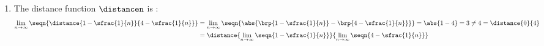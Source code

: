 \begin{example}
\begin{enumerate}
  \item The distance function $\distancen$ is  :
    \begin{align*}
      \lim_{n\to\infty}\seqn{\distance{1-\sfrac{1}{n}}{4-\sfrac{1}{n}}}
        &=\lim_{n\to\infty}\seqn{\abs{\brp{1-\sfrac{1}{n}}-\brp{4-\sfrac{1}{n}}}}
         = \abs{1-4} = 3 \neq 4 = \distance{0}{4}
      \\&= \distance{\lim_{n\to\infty}\seqn{1-\sfrac{1}{n}}}{\lim_{n\to\infty}\seqn{4-\sfrac{1}{n}}}
    \end{align*}
\end{enumerate}
\end{example}


